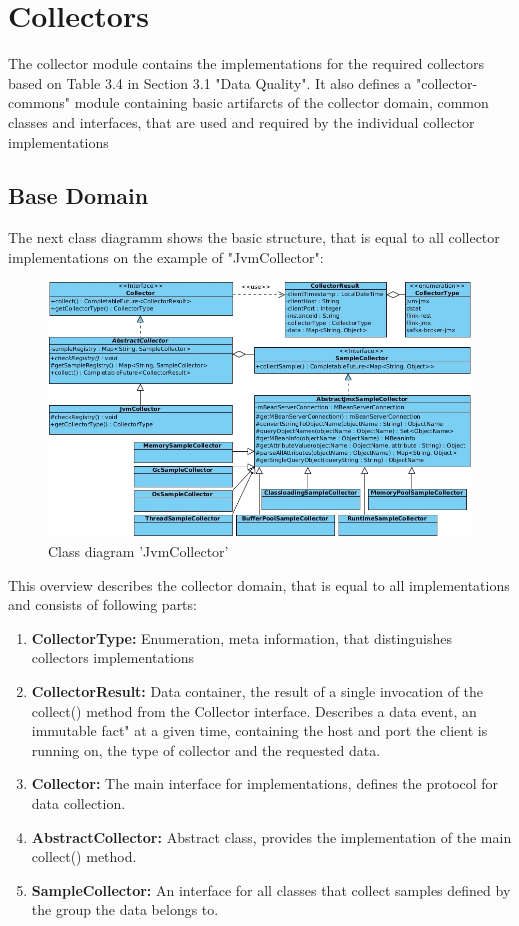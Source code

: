 \section{Collectors}

The collector module contains the implementations for the required collectors based on Table 3.4 in
Section 3.1 "Data Quality". It also defines a "collector-commons" module containing basic artifarcts
of the collector domain, common classes and interfaces, that are used and required by the individual
collector implementations

\subsection{Base Domain}

The next class diagramm shows the basic structure, that is equal to all collector implementations on the example
of "JvmCollector":
\begin{figure}[H]
	\centering
	\includegraphics[width=1.0\textwidth]{../uml/class-jvm-collector.jpg}
	\caption{Class diagram 'JvmCollector'}
	\label{class-diagram-jvm-collector}
\end{figure}

This overview describes the collector domain, that is equal to all implementations and consists of following parts:
\begin{enumerate}
    \item \textbf{CollectorType:}
    Enumeration, meta information, that distinguishes collectors implementations
    \item \textbf{CollectorResult:} Data container, the result of a single invocation of the collect() method from
    the Collector interface. Describes a data event, an immutable fact" at a given time, containing the host and port
    the client is running on, the type of collector and the requested data.
    \item \textbf{Collector:} The main interface for implementations, defines the protocol for data collection.
    \item \textbf{AbstractCollector:} Abstract class, provides the implementation of the main collect() method.
    \item \textbf{SampleCollector:} An interface for all classes that collect samples defined by the group the data
    belongs to.
\end{enumerate}

